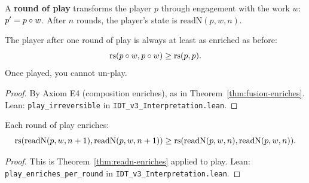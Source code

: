 \begin{definition}
\label{def:play}
A \textbf{round of play} transforms the player $p$ through engagement with
the work $w$: $p' = p \circ w$. After $n$ rounds, the player's state is
$\mathrm{readN}(p, w, n)$.
\end{definition}

\begin{theorem}
\label{thm:play-irreversible}
The player after one round of play is always at least as enriched as before:
\[
\mathrm{rs}(p \circ w, p \circ w) \geq \mathrm{rs}(p, p).
\]
Once played, you cannot un-play.
\end{theorem}

\begin{proof}
By Axiom E4 (composition enriches), as in Theorem~\ref{thm:fusion-enriches}.
Lean: \texttt{play\_irreversible} in \texttt{IDT\_v3\_Interpretation.lean}.
\end{proof}

\begin{theorem}
\label{thm:play-enriches-round}
Each round of play enriches:
\[
\mathrm{rs}(\mathrm{readN}(p, w, n+1), \mathrm{readN}(p, w, n+1)) \geq
\mathrm{rs}(\mathrm{readN}(p, w, n), \mathrm{readN}(p, w, n)).
\]
\end{theorem}

\begin{proof}
This is Theorem~\ref{thm:readn-enriches} applied to play.
Lean: \texttt{play\_enriches\_per\_round} in \texttt{IDT\_v3\_Interpretation.lean}.
\end{proof}

